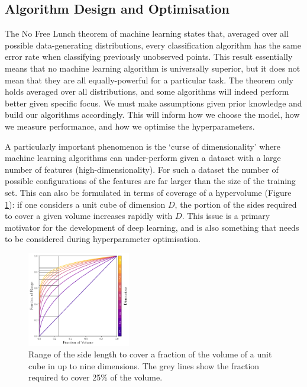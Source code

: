 \subsection{Algorithm Design and Optimisation}

The No Free Lunch theorem of machine learning \cite{NoFreeLunch} states that, averaged over all possible data-generating distributions, every classification algorithm has the same error rate when classifying previously unobserved points.
This result essentially means that no machine learning algorithm is universally superior, but it does not mean that they are all equally-powerful for a particular task. 
The theorem only holds averaged over all distributions, and some algorithms will indeed perform better given specific focus. We must make assumptions given prior knowledge and build our algorithms accordingly.
This will inform how we choose the model, how we measure performance, and how we optimise the hyperparameters. 


A particularly important phenomenon is the `curse of dimensionality' \cite{elementsOfStatsLearning} where machine learning algorithms can under-perform given a dataset with a large number of features (high-dimensionality).
For such a dataset the number of possible configurations of the features are far larger than the size of the training set. 
This can also be formulated in terms of coverage of a hypervolume (Figure \ref{fig:machine_learning:curse_of_dimensionality}): if one considers a unit cube of dimension $D$, the portion of the sides required to cover a given volume increases rapidly with $D$.
This issue is a primary motivator for the development of deep learning, and is also something that needs to be considered during hyperparameter optimisation. 
\begin{figure}[h!]
    \begin{center}
        \includegraphics[width=0.4\textwidth]{figures/machine_learning/curse_of_dimensionality.pdf}
    \end{center}
    \caption{Range of the side length to cover a fraction of the volume of a unit cube in up to nine dimensions. The grey lines show the fraction required to cover 25\% of the volume.}
        \label{fig:machine_learning:curse_of_dimensionality}
\end{figure}


